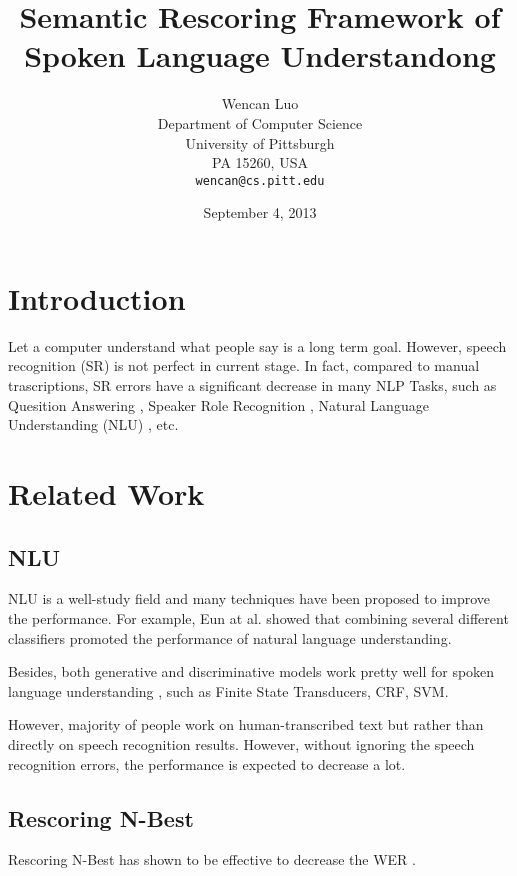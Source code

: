 \documentclass[11pt,letterpaper]{article}
\title{Semantic Rescoring Framework of Spoken Language Understandong}
\author{Wencan Luo\\
	    Department of Computer Science\\
	    University of Pittsburgh\\
	    PA 15260, USA\\
	    {\tt wencan@cs.pitt.edu}
	  }
\date{September 4, 2013}
\begin{document}
\maketitle
\begin{abstract}
  
\end{abstract}

\section{Introduction}
Let a computer understand what people say is a long term goal. However, speech recognition (SR) is not perfect in current stage. 
In fact, compared to manual trascriptions, SR errors have a significant decrease in many NLP Tasks, such as Quesition Answering \cite{Turmo:2007}, Speaker Role Recognition \cite{Garg:2008}, Natural Language Understanding (NLU) \cite{Raymond:2007}, etc.

\section{Related Work}
\subsection{NLU}

NLU is a well-study field and many techniques have been proposed to improve the performance. For example, Eun at al. showed that combining several different classifiers promoted the performance of natural language understanding. 
 
Besides, both generative and discriminative models work pretty well for spoken language understanding \cite{Raymond:2007}, such as Finite State Transducers, CRF, SVM.
 
However, majority of people work on human-transcribed text but rather than directly on speech recognition results. However, without ignoring the speech recognition errors, the performance is expected to decrease a lot. 

\subsection{Rescoring N-Best}

Rescoring N-Best has shown to be effective to decrease the WER \cite{Zhang:2004,Zhou:2006}.

\cite{Zhang:2005}

\cite{Morbini:2012}
\end{document}
